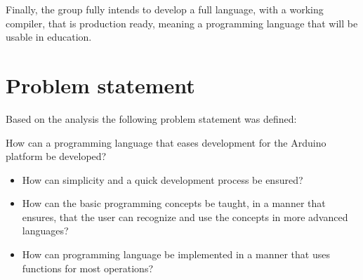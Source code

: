 Finally, the group fully intends to develop a full language, with a working compiler, that is production ready, meaning a programming language that will be usable in education.

\section{Problem statement}
Based on the analysis the following problem statement was defined:
\begin{center}
	How can a programming language that eases development for the Arduino platform be developed?

\begin{itemize}
	\item How can simplicity and a quick development process be ensured? %
	\item How can the basic programming concepts be taught, in a manner that ensures, that the user can recognize and use the concepts in more advanced languages?
	\item How can programming language be implemented in a manner that uses functions for most operations? 
\end{itemize}
\end{center}

 